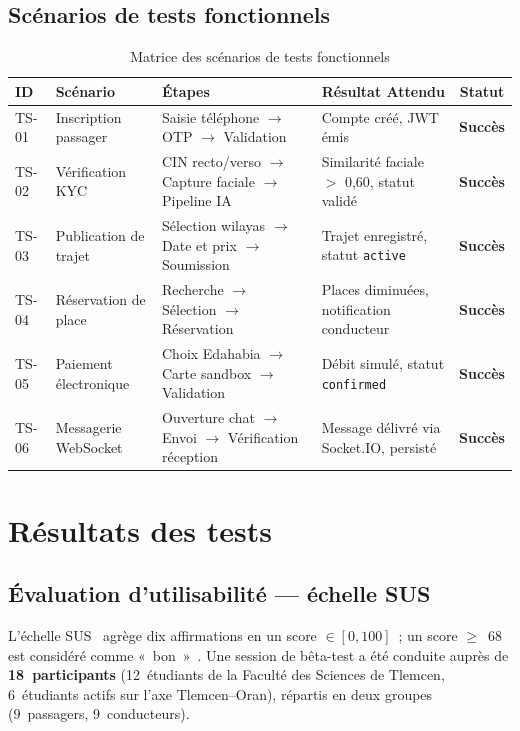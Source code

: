 \subsection{Scénarios de tests fonctionnels}
\label{sec:scenarios-tests}

\begin{table}[H]
\centering
\footnotesize
\renewcommand{\arraystretch}{1.3}
\begin{tabularx}{\textwidth}{|l|p{2.5cm}|p{3.5cm}|p{3.5cm}|c|}
\hline
\rowcolor{rohlight}
\textbf{ID} & \textbf{Scénario} & \textbf{Étapes} & \textbf{Résultat Attendu} & \textbf{Statut} \\
\hline
TS-01 & Inscription passager & Saisie téléphone $\to$ OTP $\to$ Validation & Compte créé, JWT émis & \textbf{Succès} \\
\hline
TS-02 & Vérification KYC & CIN recto/verso $\to$ Capture faciale $\to$ Pipeline IA & Similarité faciale $>$ 0,60, statut validé & \textbf{Succès} \\
\hline
TS-03 & Publication de trajet & Sélection wilayas $\to$ Date et prix $\to$ Soumission & Trajet enregistré, statut \texttt{active} & \textbf{Succès} \\
\hline
TS-04 & Réservation de place & Recherche $\to$ Sélection $\to$ Réservation & Places diminuées, notification conducteur & \textbf{Succès} \\
\hline
TS-05 & Paiement électronique & Choix Edahabia $\to$ Carte sandbox $\to$ Validation & Débit simulé, statut \texttt{confirmed} & \textbf{Succès} \\
\hline
TS-06 & Messagerie WebSocket & Ouverture chat $\to$ Envoi $\to$ Vérification réception & Message délivré via Socket.IO, persisté & \textbf{Succès} \\
\hline
\end{tabularx}
\caption{Matrice des scénarios de tests fonctionnels}
\label{tab:test-matrix}
\end{table}

\section{Résultats des tests}
\label{sec:resultats-tests}

\subsection{Évaluation d'utilisabilité --- échelle SUS}

L'échelle SUS~\cite{brooke_sus_1996} agrège dix affirmations en un score $\in [0, 100]$~; un score $\geq$~68 est considéré comme «~bon~»~\cite{Bangor2008}. Une session de bêta-test a été conduite auprès de \textbf{18~participants} (12~étudiants de la Faculté des Sciences de Tlemcen, 6~étudiants actifs sur l'axe Tlemcen--Oran), répartis en deux groupes (9~passagers, 9~conducteurs).

